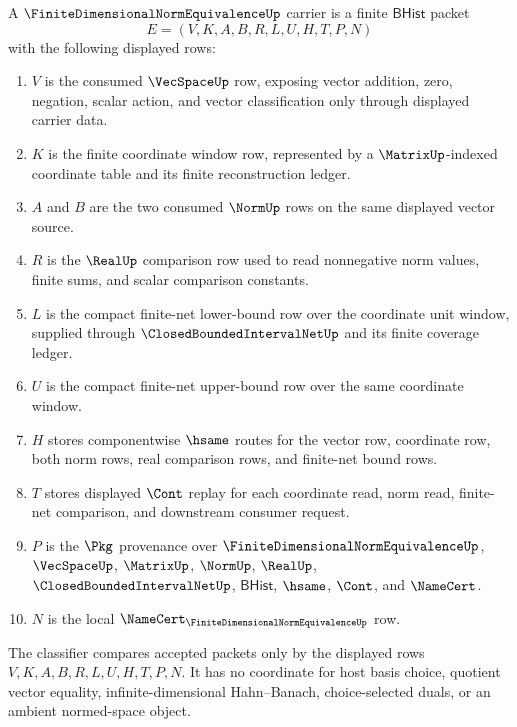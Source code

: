 \begin{definition}
\label{def:finite-dimensional-norm-equivalence-carrier}
A $\FiniteDimensionalNormEquivalenceUp$ carrier is a finite $\mathsf{BHist}$ packet
$$
E=(V,K,A,B,R,L,U,H,T,P,N)
$$
with the following displayed rows:
\begin{enumerate}
\item $V$ is the consumed $\VecSpaceUp$ row, exposing vector addition, zero, negation, scalar action, and vector classification only through displayed carrier data.
\item $K$ is the finite coordinate window row, represented by a $\MatrixUp$-indexed coordinate table and its finite reconstruction ledger.
\item $A$ and $B$ are the two consumed $\NormUp$ rows on the same displayed vector source.
\item $R$ is the $\RealUp$ comparison row used to read nonnegative norm values, finite sums, and scalar comparison constants.
\item $L$ is the compact finite-net lower-bound row over the coordinate unit window, supplied through $\ClosedBoundedIntervalNetUp$ and its finite coverage ledger.
\item $U$ is the compact finite-net upper-bound row over the same coordinate window.
\item $H$ stores componentwise $\hsame$ routes for the vector row, coordinate row, both norm rows, real comparison rows, and finite-net bound rows.
\item $T$ stores displayed $\Cont$ replay for each coordinate read, norm read, finite-net comparison, and downstream consumer request.
\item $P$ is the $\Pkg$ provenance over $\FiniteDimensionalNormEquivalenceUp$, $\VecSpaceUp$, $\MatrixUp$, $\NormUp$, $\RealUp$, $\ClosedBoundedIntervalNetUp$, $\mathsf{BHist}$, $\hsame$, $\Cont$, and $\NameCert$.
\item $N$ is the local $\NameCert_{\FiniteDimensionalNormEquivalenceUp}$ row.
\end{enumerate}
The classifier compares accepted packets only by the displayed rows $V,K,A,B,R,L,U,H,T,P,N$. It has no coordinate for host basis choice, quotient vector equality, infinite-dimensional Hahn--Banach, choice-selected duals, or an ambient normed-space object.
\end{definition}

